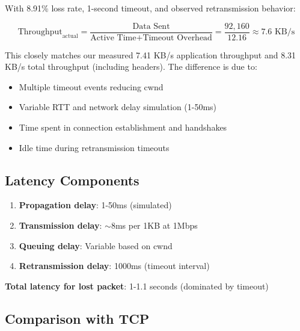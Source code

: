\documentclass[11pt,a4paper]{article}
\begin{document}
With 8.91\% loss rate, 1-second timeout, and observed retransmission behavior:

\begin{equation}
\text{Throughput}_{\text{actual}} = \frac{\text{Data Sent}}{\text{Active Time} + \text{Timeout Overhead}} = \frac{92,160}{12.16} \approx 7.6 \text{ KB/s}
\end{equation}

This closely matches our measured 7.41 KB/s application throughput and 8.31 KB/s total throughput (including headers). The difference is due to:

\begin{itemize}
    \item Multiple timeout events reducing cwnd
    \item Variable RTT and network delay simulation (1-50ms)
    \item Time spent in connection establishment and handshakes
    \item Idle time during retransmission timeouts
\end{itemize}

\subsection{Latency Components}

\begin{enumerate}
    \item \textbf{Propagation delay}: 1-50ms (simulated)
    \item \textbf{Transmission delay}: $\sim$8ms per 1KB at 1Mbps
    \item \textbf{Queuing delay}: Variable based on cwnd
    \item \textbf{Retransmission delay}: 1000ms (timeout interval)
\end{enumerate}

\textbf{Total latency for lost packet}: 1-1.1 seconds (dominated by timeout)

\subsection{Comparison with TCP}
\end{document}
